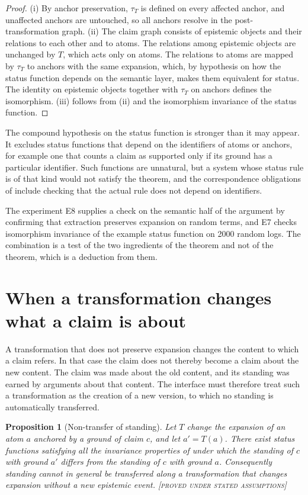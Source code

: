 \documentclass[11pt,twoside,openright]{book}
\theoremstyle{plain}
\newtheorem{proposition}[theorem]{Proposition}
\theoremstyle{definition}
\theoremstyle{remark}
\newcommand{\Proved}{\textup{\textsc{[proved under stated assumptions]}}}
\begin{document}
\begin{proof}
(i) By anchor preservation, $\tau_T$ is defined on every affected anchor, and unaffected anchors are untouched, so all anchors resolve in the post-transformation graph. (ii) The claim graph consists of epistemic objects and their relations to each other and to atoms. The relations among epistemic objects are unchanged by $T$, which acts only on atoms. The relations to atoms are mapped by $\tau_T$ to anchors with the same expansion, which, by hypothesis on how the status function depends on the semantic layer, makes them equivalent for status. The identity on epistemic objects together with $\tau_T$ on anchors defines the isomorphism. (iii) follows from (ii) and the isomorphism invariance of the status function.
\end{proof}

The compound hypothesis on the status function is stronger than it may appear. It excludes status functions that depend on the identifiers of atoms or anchors, for example one that counts a claim as supported only if its ground has a particular identifier. Such functions are unnatural, but a system whose status rule is of that kind would not satisfy the theorem, and the correspondence obligations of  include checking that the actual rule does not depend on identifiers.

The experiment E8 supplies a check on the semantic half of the argument by confirming that extraction preserves expansion on random terms, and E7 checks isomorphism invariance of the example status function on 2000 random logs. The combination is a test of the two ingredients of the theorem and not of the theorem, which is a deduction from them.

\section{When a transformation changes what a claim is about}

A transformation that does not preserve expansion changes the content to which a claim refers. In that case the claim does not thereby become a claim about the new content. The claim was made about the old content, and its standing was earned by arguments about that content. The interface must therefore treat such a transformation as the creation of a new version, to which no standing is automatically transferred.

\begin{proposition}[Non-transfer of standing]\label{prop:nontransfer}
Let $T$ change the expansion of an atom $a$ anchored by a ground of claim $c$, and let $a'=T(a)$. There exist status functions satisfying all the invariance properties of  under which the standing of $c$ with ground $a'$ differs from the standing of $c$ with ground $a$. Consequently standing cannot in general be transferred along a transformation that changes expansion without a new epistemic event.
\Proved{}
\end{proposition}
\end{document}
